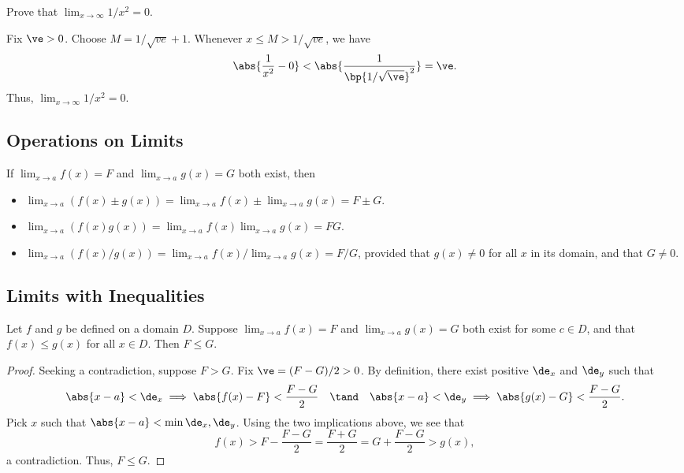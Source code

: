 \begin{sample}
    Prove that $\lim_{x \to \infty} 1/x^2 = 0$.
\end{sample}
\begin{sampans}
    Fix $\ve > 0$. Choose $M = 1/\sqrt{ve} + 1$. Whenever $x \leq M > 1/\sqrt{ve}$, we have \[\abs{\frac1{x^2} - 0} < \abs{\frac1{\bp{1/\sqrt{\ve}}^2}} = \ve.\] Thus, $\lim_{x \to \infty} 1/x^2 = 0$.
\end{sampans}

\subsection{Operations on Limits}

\begin{fact}
    If $\displaystyle\lim_{x \to a} f(x) = F$ and $\displaystyle\lim_{x \to a} g(x) = G$ both exist, then
    \begin{itemize}
        \item $\displaystyle\lim_{x \to a} (f(x) \pm g(x)) = \lim_{x \to a} f(x) \pm \lim_{x \to a} g(x) = F \pm G$.
        \item $\displaystyle\lim_{x \to a} (f(x) g(x)) = \lim_{x \to a} f(x) \lim_{x \to a} g(x) = FG$.
        \item $\displaystyle\lim_{x \to a} (f(x)/g(x)) = \lim_{x \to a} f(x) / \lim_{x \to a} g(x) = F/G$, provided that $g(x) \neq 0$ for all $x$ in its domain, and that $G \neq 0$.
    \end{itemize}
\end{fact}

\subsection{Limits with Inequalities}

\begin{proposition}
    Let $f$ and $g$ be defined on a domain $D$. Suppose $\lim_{x \to a} f(x) = F$ and $\lim_{x \to a} g(x) = G$ both exist for some $c \in D$, and that $f(x) \leq g(x)$ for all $x \in D$. Then $F \leq G$.
\end{proposition}
\begin{proof}
    Seeking a contradiction, suppose $F > G$. Fix $\ve = (F-G)/2 > 0$. By definition, there exist positive $\de_x$ and $\de_y$ such that \[\abs{x-a} < \de_x \implies \abs{f(x) - F} < \frac{F-G}{2} \quad \tand \quad \abs{x-a} < \de_y \implies \abs{g(x) - G} < \frac{F-G}{2}.\] Pick $x$ such that $\abs{x - a} < \min{\de_x, \de_y}$. Using the two implications above, we see that \[f(x) > F - \frac{F-G}{2} = \frac{F+G}{2} = G + \frac{F-G}{2} > g(x),\] a contradiction. Thus, $F \leq G$.
\end{proof}

